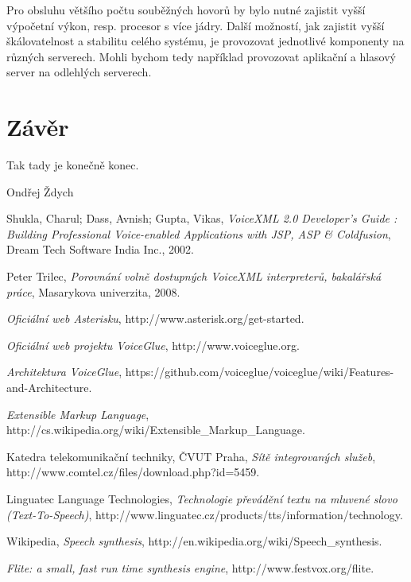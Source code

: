 \documentclass[ing,male,java,dept460]{diploma}						%
\begin{document}
Pro obsluhu většího počtu souběžných hovorů by bylo nutné zajistit vyšší výpočetní výkon, resp. procesor s více jádry. Další možností, jak zajistit vyšší škálovatelnost a stabilitu celého systému, je provozovat jednotlivé komponenty na různých serverech. Mohli bychom tedy například provozovat aplikační a hlasový server na odlehlých serverech.

\section{Závěr}
\label{sec:Conclusion}
Tak tady je konečně konec.

\bigskip
\begin{flushright}
Ondřej Ždych
\end{flushright}

\begin{thebibliography}{99}

 Shukla, Charul; Dass, Avnish; Gupta, Vikas,
\textit{VoiceXML 2.0 Developer's Guide : Building Professional Voice-enabled Applications with JSP, ASP & Coldfusion}, Dream Tech Software India Inc., 2002.

 Peter Trilec,
\textit{Porovnání volně dostupných VoiceXML interpreterů, bakalářská práce}, Masarykova univerzita, 2008.

\textit{Oficiální web Asterisku}, http://www.asterisk.org/get-started.

\textit{Oficiální web projektu VoiceGlue}, http://www.voiceglue.org.

\textit{Architektura VoiceGlue}, https://github.com/voiceglue/voiceglue/wiki/Features-and-Architecture.

\textit{Extensible Markup Language}, http://cs.wikipedia.org/wiki/Extensible\_Markup\_Language.

 Katedra telekomunikační techniky, ČVUT Praha,
\textit{Sítě integrovaných služeb}, http://www.comtel.cz/files/download.php?id=5459‎.

 Linguatec Language Technologies,
\textit{Technologie převádění textu na mluvené slovo (Text-To-Speech)}, http://www.linguatec.cz/products/tts/information/technology.

 Wikipedia,
\textit{Speech synthesis}, http://en.wikipedia.org/wiki/Speech\_synthesis.

\textit{Flite: a small, fast run time synthesis engine}, http://www.festvox.org/flite.


\end{thebibliography}
\end{document}
